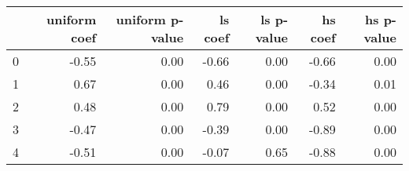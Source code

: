 \begin{tabular}{lrrrrrr}
\toprule
 & uniform coef & uniform p-value & ls coef & ls p-value & hs coef & hs p-value \\
\midrule
0 & -0.55 & 0.00 & -0.66 & 0.00 & -0.66 & 0.00 \\
1 & 0.67 & 0.00 & 0.46 & 0.00 & -0.34 & 0.01 \\
2 & 0.48 & 0.00 & 0.79 & 0.00 & 0.52 & 0.00 \\
3 & -0.47 & 0.00 & -0.39 & 0.00 & -0.89 & 0.00 \\
4 & -0.51 & 0.00 & -0.07 & 0.65 & -0.88 & 0.00 \\
\bottomrule
\end{tabular}
